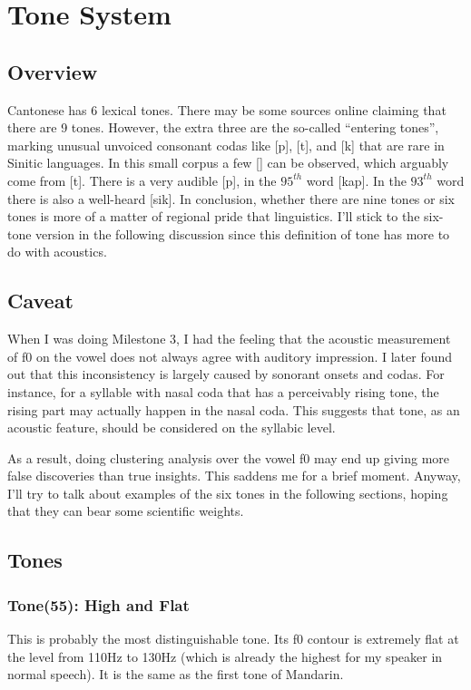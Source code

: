 \documentclass[a4paper]{article}
\begin{document}
\section{Tone System}

\subsection{Overview}
Cantonese has 6 lexical tones. There may be some sources online claiming that there are 9 tones. However, the extra three are the so-called ``entering tones'', marking unusual unvoiced consonant codas like [p], [t], and [k] that are rare in Sinitic languages. In this small corpus a few [\textglotstop] can be observed, which arguably come from [t]. There is a very audible [p], in the $95^{th}$ word [kap]. In the $93^{th}$ word there is also a well-heard [sik]. In conclusion, whether there are nine tones or six tones is more of a matter of regional pride that linguistics. I'll stick to the six-tone version in the following discussion since this definition of tone has more to do with acoustics.

\subsection{Caveat}
When I was doing Milestone 3, I had the feeling that the acoustic measurement of f0 on the vowel does not always agree with auditory impression. I later found out that this inconsistency is largely caused by sonorant onsets and codas. For instance, for a syllable with nasal coda that has a perceivably rising tone, the rising part may actually happen in the nasal coda. This suggests that tone, as an acoustic feature, should be considered on the syllabic level. 

As a result, doing clustering analysis over the vowel f0 may end up giving more false discoveries than true insights. This saddens me for a brief moment. Anyway, I'll try to talk about examples of the six tones in the following sections, hoping that they can bear some scientific weights. 

\subsection{Tones}

\subsubsection{Tone(55): High and Flat}
This is probably the most distinguishable tone. Its f0 contour is extremely flat at the level from 110Hz to 130Hz (which is already the highest for my speaker in normal speech). It is the same as the first tone of Mandarin. 
\end{document}
